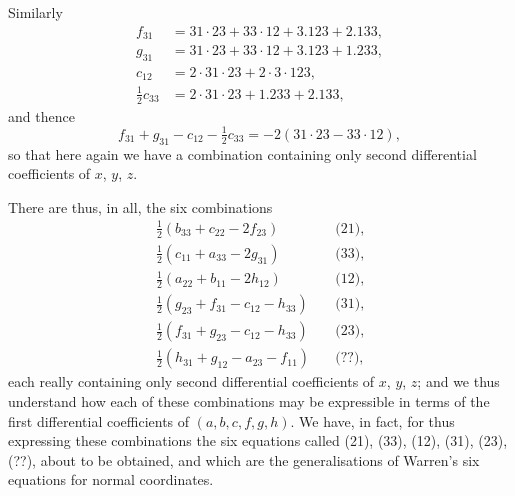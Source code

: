 \documentclass[11pt,a4paper]{book}
\begin{document}
Similarly
\[
\begin{aligned}
f_{31} &= 31 \cdot 23 + 33 \cdot 12 + 3.123 + 2.133, \\
g_{31} &= 31 \cdot 23 + 33 \cdot 12 + 3.123 + 1.233, \\
c_{12} &= 2 \cdot 31 \cdot 23 + 2 \cdot 3 \cdot 123, \\
\tfrac{1}{2}c_{33} &= 2 \cdot 31 \cdot 23 + 1.233 + 2.133,
\end{aligned}
\]
and thence
\[
f_{31} + g_{31} - c_{12} - \tfrac{1}{2}c_{33} = -2(31 \cdot 23 - 33 \cdot 12),
\]
so that here again we have a combination containing only second differential coefficients of $x$, $y$, $z$.

There are thus, in all, the six combinations
\[
\begin{aligned}
\tfrac{1}{2}(b_{33} + c_{22} - 2f_{23}) &\quad \text{(21)}, \\
\tfrac{1}{2}(c_{11} + a_{33} - 2g_{31}) &\quad \text{(33)}, \\
\tfrac{1}{2}(a_{22} + b_{11} - 2h_{12}) &\quad \text{(12)}, \\
\tfrac{1}{2}(g_{23} + f_{31} - c_{12} - h_{33}) &\quad \text{(31)}, \\
\tfrac{1}{2}(f_{31} + g_{23} - c_{12} - h_{33}) &\quad \text{(23)}, \\
\tfrac{1}{2}(h_{31} + g_{12} - a_{23} - f_{11}) &\quad \text{(??)},
\end{aligned}
\]
each really containing only second differential coefficients of $x$, $y$, $z$; and we thus understand how each of these combinations may be expressible in terms of the first differential coefficients of $(a, b, c, f, g, h)$. We have, in fact, for thus expressing these combinations the six equations called (21), (33), (12), (31), (23), (??), about to be obtained, and which are the generalisations of Warren's six equations for normal coordinates.
\end{document}
